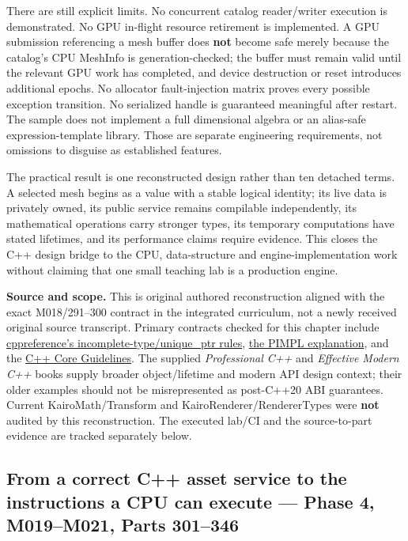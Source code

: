 There are still explicit limits. No concurrent catalog reader/writer execution is demonstrated. No GPU in-flight resource retirement is implemented. A GPU submission referencing a mesh buffer does \textbf{not} become safe merely because the catalog's CPU MeshInfo is generation-checked; the buffer must remain valid until the relevant GPU work has completed, and device destruction or reset introduces additional epochs. No allocator fault-injection matrix proves every possible exception transition. No serialized handle is guaranteed meaningful after restart. The sample does not implement a full dimensional algebra or an alias-safe expression-template library. Those are separate engineering requirements, not omissions to disguise as established features.

The practical result is one reconstructed design rather than ten detached terms. A selected mesh begins as a value with a stable logical identity; its live data is privately owned, its public service remains compilable independently, its mathematical operations carry stronger types, its temporary computations have stated lifetimes, and its performance claims require evidence. This closes the C++ design bridge to the CPU, data-structure and engine-implementation work without claiming that one small teaching lab is a production engine.

\textbf{Source and scope.} This is original authored reconstruction aligned with the exact M018/291--300 contract in the integrated curriculum, not a newly received original source transcript. Primary contracts checked for this chapter include \href{https://en.cppreference.com/w/cpp/memory/unique_ptr}{cppreference's incomplete-type/unique\_ptr rules}, \href{https://en.cppreference.com/w/cpp/language/pimpl}{the PIMPL explanation}, and the \href{https://isocpp.github.io/CppCoreGuidelines/CppCoreGuidelines}{C++ Core Guidelines}. The supplied \emph{Professional C++} and \emph{Effective Modern C++} books supply broader object/lifetime and modern API design context; their older examples should not be misrepresented as post-C++20 ABI guarantees. Current KairoMath/Transform and KairoRenderer/RendererTypes were \textbf{not} audited by this reconstruction. The executed lab/CI and the source-to-part evidence are tracked separately below.

\subsection{From a correct C++ asset service to the instructions a CPU can execute --- Phase 4, M019--M021, Parts 301--346}\label{from-a-correct-c-asset-service-to-the-instructions-a-cpu-can-execute-phase-4-m019m021-parts-301346}

